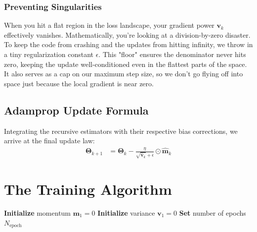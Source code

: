 \subsubsection*{Preventing Singularities}
When you hit a flat region in the loss landscape, your gradient power $\boldsymbol{v}_k$ effectively vanishes. Mathematically, you're looking at a division-by-zero disaster. To keep the code from crashing and the updates from hitting infinity, we throw in a tiny regularization constant $\epsilon$. This "floor" ensures the denominator never hits zero, keeping the update well-conditioned even in the flattest parts of the space. It also serves as a cap on our maximum step size, so we don't go flying off into space just because the local gradient is near zero.

\subsection*{Adamprop Update Formula}
Integrating the recursive estimators with their respective bias corrections, we arrive at the final update law:
\begin{align}
	\boldsymbol{\Theta}_{k+1} &= \boldsymbol{\Theta}_{k} - \frac{\eta}{\sqrt{\hat{\boldsymbol{v}}_k} + \epsilon} \odot \hat{\boldsymbol{m}}_k
\end{align}
\section{The Training Algorithm}
\begin{algorithm}[H]
	\SetAlgoLined
	\DontPrintSemicolon
	\caption{Full Training Algorithm on mini-batches}
	
	\BlankLine
	\textbf{Initialize} momentum $\boldsymbol{m}_1=0$\;
	\textbf{Initialize} variance $\boldsymbol{v}_1=0$\;
	\textbf{Set} number of epochs $N_\mathrm{epoch}$\;
	\BlankLine
\end{algorithm}

